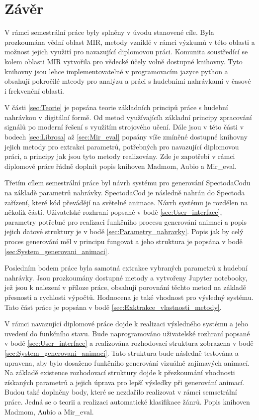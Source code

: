 \chapter*{Závěr}
{}

V rámci semestrální práce byly splněny v úvodu stanovené cíle. Byla prozkoumána vědní oblast \acs{MIR}, metody vzniklé v rámci výzkumů v této oblasti a možnost jejich využití pro navazující diplomovou práci. Komunita soustředící se kolem oblasti \acs{MIR} vytvořila pro vědecké účely volně dostupné knihovny. Tyto knihovny jsou lehce implementovatelné v programovacím jazyce python a obsahují pokročilé mteody pro analýzu a práci s hudebními nahrávkami v časové i frekvenční oblasti.

V části \ref{sec:Teorie} je popsána teorie základních principů práce s hudební nahrávkou v digitální formě. Od metod využívajícíh základní principy zpracování signálů po moderní řešení s využitím strojového učení. Dále jsou v této části v bodech \ref{sec:Librosa} až \ref{sec:Mir_eval} popsány víše zmíněné dostupné knihovny jejich metody pro extrakci parametrů, potřebných pro navazující diplomovou práci, a principy jak jsou tyto metody realizovány. Zde je zapotřebí v rámci diplomové práce řádně doplnit popis knihoven Madmom, Aubio a Mir\_eval.

Třetím cílem semestrální práce byl návrh systému pro generování SpectodaCodu na základě parametrů nahrávky. SpectodaCod je následně nahrán do Spectoda zařízení, které kód převádějí na světelné animace. Návrh systému je rozdělen na několik částí. Uživatelské rozhraní popsané v bodě \ref{sec:User_interface}, parametry potřebné pro realizaci funkčního procesu generování animací a popis jejich datové struktury je v bodě \ref{sec:Parametry_nahravky}. Popis jak by celý proces generování měl v principu fungovat a jeho struktura je popsána v bodě \ref{sec:System_generovani_animaci}.

Posledním bodem práce byla samotná extrakce vybraných parametrů z hudební nahrávky. Jsou prozkoumány dostupné metody a vytvořeny Jupyter notebooky, jež jsou k nalezení v příloze práce, obsahují porovnání těchto metod na základě přesnosti a rychlosti výpočtů. Hodnocena je také vhodnost pro výsledný systému. Tato část práce je popsána v bodě \ref{sec:Exktrakce_vlastnosti_metody}.

V rámci navazující diplomové práce dojde k realizaci výsledného systému a jeho uvedení do funkčního stavu. Bude naprogramováno uživatelské rozhraní popsané v bodě \ref{sec:User_interface} a realizována rozhodovací struktura zobrazena v bodě \ref{sec:System_generovani_animaci}. Tato struktura bude následně testována a upravena, aby bylo dosaženo funkčního generování vizuálně zajímavých animací. Na základě existence rozhodovací struktury dojde k přezkoumání vhodnosti získaných parametrů a jejich úprava pro lepší výsledky při generování animací. Budou také doplněny body, které se nezdařilo realizovat v rámci semsetrální práce. Jedná se o teorii a realizaci automatické klasifikace žánrů. Popis knihoven Madmom, Aubio a Mir\_eval.



